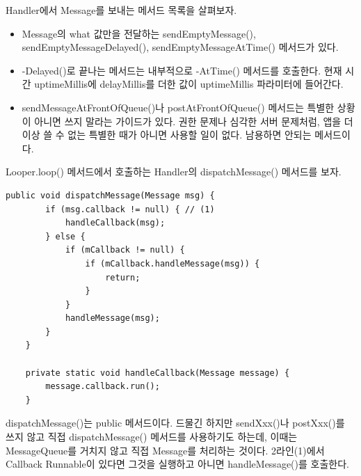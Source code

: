 Handler에서 Message를 보내는 메서드 목록을 살펴보자.\\
\newline

\begin{itemize}
\item Message의 what 값만을 전달하는 sendEmptyMessage(), sendEmptyMessageDelayed(), sendEmptyMessageAtTime() 메서드가 있다.

\item -Delayed()로 끝나는 메서드는 내부적으로 -AtTime() 메서드를 호출한다. 현재 시간 uptimeMillis에 delayMillis를 더한 값이 uptimeMillis 파라미터에 들어간다.

\item sendMessageAtFrontOfQueue()나 postAtFrontOfQueue() 메서드는 특별한 상황이 아니면 쓰지 말라는 가이드가 있다. 
권한 문제나 심각한 서버 문제처럼, 앱을 더 이상 쓸 수 없는 특별한 때가 아니면 사용할 일이 없다. 남용하면 안되는 메서드이다.
\end{itemize}

Looper.loop() 메서드에서 호출하는 Handler의 dispatchMessage() 메서드를 보자.
\begin{lstlisting}[frame=single, caption=Handler.java] 
	public void dispatchMessage(Message msg) {
		if (msg.callback != null) { // (1)
			handleCallback(msg);
		} else {
			if (mCallback != null) {
				if (mCallback.handleMessage(msg)) {
					return;
				}
			}
			handleMessage(msg);
		}
	}
	
	private static void handleCallback(Message message) {
		message.callback.run();
	}
\end{lstlisting}
dispatchMessage()는 public 메서드이다. 
드물긴 하지만 sendXxx()나 postXxx()를 쓰지 않고 직접 dispatchMessage() 메서드를 사용하기도 하는데, 이때는 MessageQueue를 거치지 않고 직접 Message를 처리하는 것이다.
2라인(1)에서 Callback Runnable이 있다면 그것을 실행하고 아니면 handleMessage()를 호출한다.

